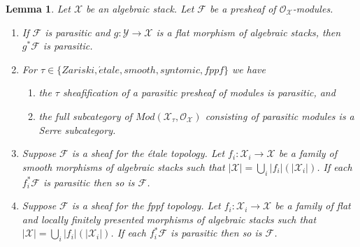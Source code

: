 \documentclass[10pt,a4paper]{amsart}
\theoremstyle{plain}
\newtheorem{lemma}[subsection]{Lemma}
\theoremstyle{definition}
\theoremstyle{remark}
\numberwithin{equation}{subsection}
\def\etale{{\acute{e}tale}}
\begin{document}
\begin{lemma}
\label{lemma-parasitic}
Let $\mathcal{X}$ be an algebraic stack. Let $\mathcal{F}$
be a presheaf of $\mathcal{O}_\mathcal{X}$-modules.
\begin{enumerate}
\item If $\mathcal{F}$ is parasitic and
$g : \mathcal{Y} \to \mathcal{X}$ is a flat morphism of algebraic stacks,
then $g^*\mathcal{F}$ is parasitic.
\item For $\tau \in \{Zariski, \etale, smooth, syntomic, fppf\}$
we have
\begin{enumerate}
\item the $\tau$ sheafification of a parasitic presheaf of modules is
parasitic, and
\item the full subcategory of
$\textit{Mod}(\mathcal{X}_\tau, \mathcal{O}_\mathcal{X})$
consisting of parasitic modules is a Serre subcategory.
\end{enumerate}
\item Suppose $\mathcal{F}$ is a sheaf for the \'etale topology.
Let $f_i : \mathcal{X}_i \to \mathcal{X}$ be a family of
smooth morphisms of algebraic stacks such that
$|\mathcal{X}| = \bigcup_i |f_i|(|\mathcal{X}_i|)$. If each
$f_i^*\mathcal{F}$ is parasitic then so is $\mathcal{F}$.
\item Suppose $\mathcal{F}$ is a sheaf for the fppf topology.
Let $f_i : \mathcal{X}_i \to \mathcal{X}$ be a family of
flat and locally finitely presented morphisms of algebraic stacks such that
$|\mathcal{X}| = \bigcup_i |f_i|(|\mathcal{X}_i|)$. If each
$f_i^*\mathcal{F}$ is parasitic then so is $\mathcal{F}$.
\end{enumerate}
\end{lemma}
\end{document}
